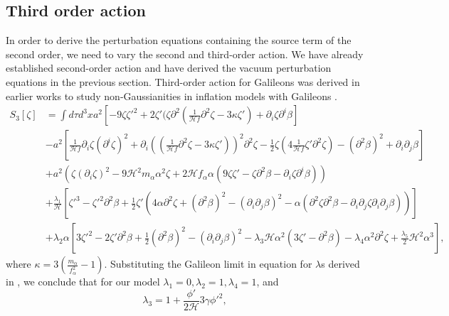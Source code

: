 \documentclass[12pt,a4paper]{article}
\numberwithin{equation}{section}
\numberwithin{equation}{section}
\begin{document}
\subsection{Third order action}
In order to derive the perturbation equations containing the source term of the second order, we need to vary the second and third-order action. We have already established second-order action and have derived the vacuum perturbation equations in the previous section. 
Third-order action for Galileons was derived in earlier works to study non-Gaussianities in inflation models with Galileons \cite{Gao:2011qe,Koehn:2015vvy}. 
\begin{equation}
\begin{split} 
    S_3[\zeta] &= \int d\tau d^3x  a^2  \left[-9 \zeta \zeta'^2+2\zeta'(\zeta \partial^2(\frac{1}{\mathcal{H}f}\partial^2\zeta-3 \kappa \zeta')+  \partial_i\zeta \partial^i \beta \right]\\
    &-a^2 \left[\frac{1}{\mathcal{H} f} \partial_i \zeta (\partial^i \zeta)^2+ \partial_i((\frac{1}{\mathcal{H} f}\partial^2\zeta-3 \kappa \zeta'))^2 \partial^2 \zeta-\frac{1}{2} \zeta \left(4 \frac{1}{\mathcal{H} f}  \zeta' \partial^2 \zeta \right)-(\partial^2 \beta)^2+ \partial_i \partial_j \beta \right]\\
    & + a^2  \left( \zeta (\partial_i \zeta)^2-9 \mathcal{H}^2 m_{\alpha} \alpha^2 \zeta+ 2\mathcal{H} f_{\alpha} \alpha (9\zeta \zeta'-\zeta \partial^2\beta - \partial_i \zeta \partial^{i} \beta) \right) \\
   & + \frac{\lambda_1}{\mathcal{H}} \left[ \zeta'^3-\zeta'^2\partial^2 \beta +\frac{1}{2} \zeta' \left(4 \alpha \partial^2 \zeta + (\partial^2 \beta)^2-(\partial_i \partial_j \beta)^2-\alpha \left(\partial^2 \zeta \partial^2 \beta -\partial_i \partial_j \zeta \partial_i \partial_j \beta  \right) \right) \right] \\
   & + \lambda_2 \alpha \left[3 \zeta'^2-2\zeta'\partial^2 \beta+ \frac{1}{2} (\partial^2 \beta)^2 - (\partial_i \partial_j \beta)^2 - \lambda_3 \mathcal{H} \alpha^2 (3 \zeta'-\partial^2 \beta)-\lambda_4 \alpha^2 \partial^2 \zeta + \frac{\lambda_5}{2} \mathcal{H}^2 \alpha^3  \right], 
    \end{split}
    \label{eq:ac3rd}
\end{equation}
where $\kappa = 3\left(\frac{m_{\alpha}}{f_{\alpha}^2}-1\right)$. 
Substituting the Galileon limit in equation for $\lambda$s derived in \cite{Gao:2011qe}, we conclude that for our model $\lambda_1=0, \lambda_2=1, \lambda_4=1$, and 
\begin{equation}
    \lambda_3 = 1+ \frac{\phi'}{2\mathcal{H}}  3 \gamma \phi'^2,
    \label{eq:lambda3}
\end{equation}
\end{document}
